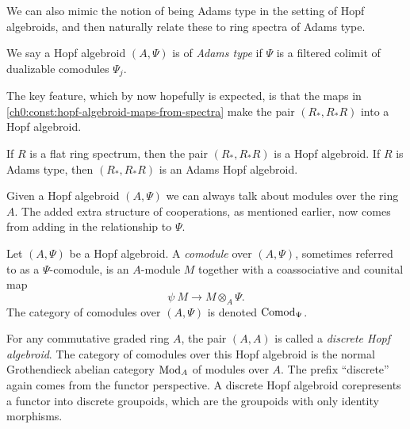 We can also mimic the notion of being Adams type in the setting of Hopf algebroids, and then naturally relate these to ring spectra of Adams type. 

\begin{definition}
    \label{ch0:def:adams-hopf-algebroid}
    We say a Hopf algebroid $(A, \Psi)$ is of \emph{Adams type} if $\Psi$ is a filtered colimit of dualizable comodules $\Psi_j$. 
\end{definition}

The key feature, which by now hopefully is expected, is that the maps in \cref{ch0:const:hopf-algebroid-maps-from-spectra} make the pair $(R_*, R_*R)$ into a Hopf algebroid. 

\begin{proposition}
    \label{ch0:prop:hopf-algebroid-from-spectra}
    If $R$ is a flat ring spectrum, then the pair $(R_*, R_*R)$ is a Hopf algebroid. If $R$ is Adams type, then $(R_*, R_*R)$ is an Adams Hopf algebroid. 
\end{proposition}

Given a Hopf algebroid $(A,\Psi)$ we can always talk about modules over the ring $A$. The added extra structure of cooperations, as mentioned earlier, now comes from adding in the relationship to $\Psi$. 

\begin{definition}
    \label{ch0:def:comodule-over-hopf-algebroid}
    Let $(A, \Psi)$ be a Hopf algebroid. A \emph{comodule} over $(A, \Psi)$, sometimes referred to as a $\Psi$-comodule, is an $A$-module $M$ together with a coassociative and counital map 
    \[\psi\: M\longrightarrow M\otimes_A \Psi.\] 
    The category of comodules over $(A, \Psi)$ is denoted \emph{$\mathrm{Comod}_\Psi$}. 
\end{definition}

\begin{example}
    \label{ch0:ex:modules-as-discrete-Hopf-algebroids}
    For any commutative graded ring $A$, the pair $(A, A)$ is called a \emph{discrete Hopf algebroid}. The category of comodules over this Hopf algebroid is the normal Grothendieck  abelian category $\mathrm{Mod}_A$ of modules over $A$. The prefix ``discrete'' again comes from the functor perspective. A discrete Hopf algebroid corepresents a functor into discrete groupoids, which are the groupoids with only identity morphisms. 
\end{example}

